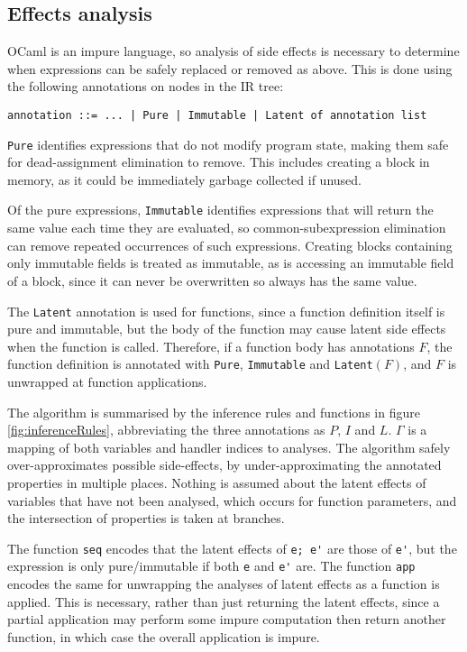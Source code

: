 \subsection{Effects analysis}
OCaml is an impure language, so analysis of side effects is necessary to determine when expressions can be safely replaced or removed as above. This is done using the following annotations on nodes in the IR tree:

\verb"annotation ::= ... | Pure | Immutable | Latent of annotation list"

\verb|Pure| identifies expressions that do not modify program state, making them safe for dead-assignment elimination to remove. This includes creating a block in memory, as it could be immediately garbage collected if unused.

Of the pure expressions, \verb|Immutable| identifies expressions that will return the same value each time they are evaluated, so common-subexpression elimination can remove repeated occurrences of such expressions. Creating blocks containing only immutable fields is treated as immutable, as is accessing an immutable field of a block, since it can never be overwritten so always has the same value.

The \verb|Latent| annotation is used for functions, since a function definition itself is pure and immutable, but the body of the function may cause latent side effects when the function is called. Therefore, if a function body has annotations $F$, the function definition is annotated with \verb|Pure|, \verb|Immutable| and \verb|Latent|$(F)$, and $F$ is unwrapped at function applications.


The algorithm is summarised by the inference rules and functions in figure \ref{fig:inferenceRules}, abbreviating the three annotations as $P$, $I$ and $L$. $\Gamma$ is a mapping of both variables and handler indices to analyses. 
The algorithm safely over-approximates possible side-effects, by under-approximating the annotated properties in multiple places. 
Nothing is assumed about the latent effects of variables that have not been analysed, which occurs for function parameters,
 and the intersection of properties is taken at branches.

The function \verb|seq| encodes that the latent effects of \verb|e; e'| are those of \verb|e'|, but the expression is only pure/immutable if both \verb|e| and \verb|e'| are. The function \verb|app| encodes the same for unwrapping the analyses of latent effects as a function is applied. This is necessary, rather than just returning the latent effects, since a partial application may perform some impure computation then return another function, in which case the overall application is impure.

